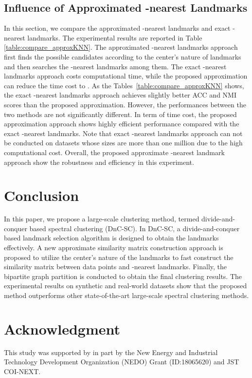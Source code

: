 \documentclass[a4paper,fleqn]{cas-dc}
\begin{document}
\subsection{Influence of Approximated -nearest Landmarks }
\label{sec:cmpApproxKNN}

In this section, we compare the approximated -nearest landmarks and exact -nearest landmarks. 
The experimental results are reported in Table \ref{table:compare_approxKNN}.
The approximated -nearest landmarks approach first finds the possible candidates according to the center's nature of landmarks and then searches the -nearest landmarks among them.
The exact -nearest landmarks approach costs  computational time, while the proposed approximation can reduce the time cost to .
As the Tables~\ref{table:compare_approxKNN} shows, the exact -nearest landmarks approach achieves slightly better ACC and NMI scores than the proposed approximation.
However, the performances between the two methods are not significantly different. 
In term of time cost, the proposed approximation approach shows highly efficient performance compared with the exact -nearest landmarks.
Note that exact -nearest landmarks approach can not be conducted on datasets whose sizes are more than one million due to the high computational cost.
Overall, the proposed approximate -nearest landmark approach show the robustness and efficiency in this experiment. 

\section{Conclusion}
\label{sec:conclusion}
In this paper, we propose a large-scale clustering method, termed divide-and-conquer based spectral clustering (DnC-SC).
In DnC-SC, a divide-and-conquer based landmark selection algorithm is designed to obtain the landmarks effectively.
A new approximate similarity matrix construction approach is proposed to utilize the center's nature of the landmarks to fast construct the similarity matrix between data points and -nearest landmarks.
Finally, the bipartite graph partition is conducted to obtain the final clustering results. 
The experimental results on synthetic and real-world datasets show that the proposed method outperforms other state-of-the-art large-scale spectral clustering methods.

\section*{Acknowledgment}
This study was supported by in part by the New Energy and Industrial Technology Development Organization (NEDO) Grant (ID:18065620) and JST COI-NEXT.
\end{document}
